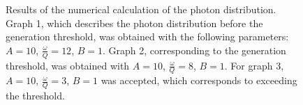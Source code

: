 \begin{figure}
\centering

\caption{Results of the numerical calculation of the photon distribution. Graph
  1, which describes the photon distribution before the generation threshold,
  was obtained with the following parameters: $A = 10$, $\frac{\omega}{Q} = 12$,
  $B = 1$. Graph 2, corresponding to the generation threshold, was obtained with $A = 10$, $\frac{\omega}{Q} = 8$,
  $B = 1$. For graph 3, $A = 10$, $\frac{\omega}{Q} = 3$,
  $B = 1$ was accepted, which corresponds to exceeding the threshold.}
\label{figPart2Ch1_4}
\end{figure}
